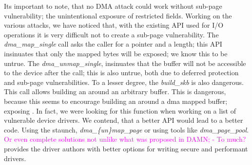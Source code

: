 Its important to note, that no DMA attack could work without sub-page vulnerability; the unintentional exposure of restricted fields. Working on the various attacks, we have noticed that, with the existing API used for I/O operations it is very difficult not to create a sub-page vulnerability. The \textit{dma\_map\_single} call asks the caller for a pointer and a length; this API insinuates that only the mapped bytes will be exposed; we know this to be untrue. The \textit{dma\_unmap\_single}, insinuates that the buffer will not be accessible to the device after the call; this is also untrue, both due to deferred protection and sub-page vulnerabilities. To a lesser degree, the \textit{build\_skb} is also dangerous. This call allows building an \skb around an arbitrary buffer. This is dangerous, because this seems to encourage building an \skb around a dma mapped buffer; exposing \shinfo. In fact, we were looking for this function when working on a list of vulnerable device drivers. We contend, that a better API would lead to a better code. Using the staunch, \textit{dma\_\{un\}map\_page} or using tools like \textit{dma\_page\_pool}. \textcolor{magenta}{Or even complete solutions not unlike what was proposed in DAMN\cite{MSMT18,MMT16}; - To much?} provides the driver authors with better options for writing secure and performant drivers. 



